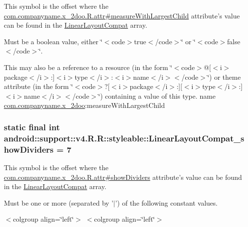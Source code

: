 This symbol is the offset where the \hyperlink{classcom_1_1companyname_1_1x__2doo_1_1_r_1_1attr_88219244ae2e88fca8cec2889d3c7a79}{com.companyname.x\_\-2doo.R.attr\#measureWithLargestChild} attribute's value can be found in the \hyperlink{classandroid_1_1support_1_1v4_1_1_r_1_1styleable_d67ed8d09a6471da7a8c3ba1552dad7e}{LinearLayoutCompat} array.

Must be a boolean value, either \char`\"{}$<$code$>$true$<$/code$>$\char`\"{} or \char`\"{}$<$code$>$false$<$/code$>$\char`\"{}. 

This may also be a reference to a resource (in the form \char`\"{}$<$code$>$@\mbox{[}$<$i$>$package$<$/i$>$:\mbox{]}$<$i$>$type$<$/i$>$:$<$i$>$name$<$/i$>$$<$/code$>$\char`\"{}) or theme attribute (in the form \char`\"{}$<$code$>$?\mbox{[}$<$i$>$package$<$/i$>$:\mbox{]}\mbox{[}$<$i$>$type$<$/i$>$:\mbox{]}$<$i$>$name$<$/i$>$$<$/code$>$\char`\"{}) containing a value of this type.  name \hyperlink{namespacecom_1_1companyname_1_1x__2doo}{com.companyname.x\_\-2doo}:measureWithLargestChild \hypertarget{classandroid_1_1support_1_1v4_1_1_r_1_1styleable_fe02967a715f53721d56bd6750def3f6}{
\subsubsection[{LinearLayoutCompat\_\-showDividers}]{\setlength{\rightskip}{0pt plus 5cm}static final int android::support::v4.R.R::styleable::LinearLayoutCompat\_\-showDividers = 7}}
\label{classandroid_1_1support_1_1v4_1_1_r_1_1styleable_fe02967a715f53721d56bd6750def3f6}


This symbol is the offset where the \hyperlink{classcom_1_1companyname_1_1x__2doo_1_1_r_1_1attr_e7a00a5551b4b5d4b33a0d77a9794640}{com.companyname.x\_\-2doo.R.attr\#showDividers} attribute's value can be found in the \hyperlink{classandroid_1_1support_1_1v4_1_1_r_1_1styleable_d67ed8d09a6471da7a8c3ba1552dad7e}{LinearLayoutCompat} array.

Must be one or more (separated by '$|$') of the following constant values. \begin{TabularC}{0}
\hline
\end{TabularC}
$<$colgroup align=\char`\"{}left\char`\"{}$>$ $<$colgroup align=\char`\"{}left\char`\"{}$>$ 

